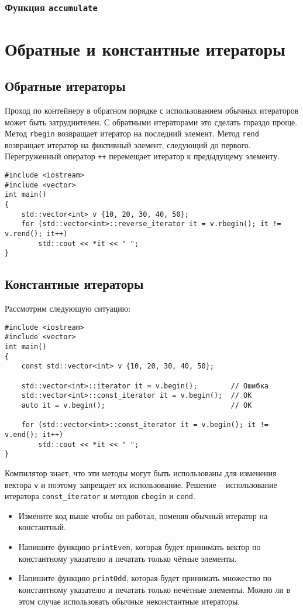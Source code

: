 \documentclass{article}
\begin{document}
\subsubsection*{Функция \texttt{accumulate}}



\newpage
\section*{Обратные и константные итераторы}
\subsection*{Обратные итераторы}
Проход по контейнеру в обратном порядке с использованием обычных итераторов может быть затруднителен. С обратными итераторами это сделать гораздо проще. Метод \texttt{rbegin} возвращает итератор на последний элемент. Метод \texttt{rend} возвращает итератор на фиктивный элемент, следующий до первого. Перегруженный оператор \texttt{++} перемещает итератор к предыдущему элементу.
\begin{lstlisting}
#include <iostream>
#include <vector>
int main()
{
    std::vector<int> v {10, 20, 30, 40, 50};
    for (std::vector<int>::reverse_iterator it = v.rbegin(); it != v.rend(); it++)
        std::cout << *it << " ";
}
\end{lstlisting}
\subsection*{Константные итераторы}
Рассмотрим следующую ситуацию:
\begin{lstlisting}
#include <iostream>
#include <vector>
int main() 
{
    const std::vector<int> v {10, 20, 30, 40, 50};
    
    std::vector<int>::iterator it = v.begin();        // Ошибка
    std::vector<int>::const_iterator it = v.begin();  // ОК
    auto it = v.begin();                              // ОК
    
    for (std::vector<int>::const_iterator it = v.begin(); it != v.end(); it++)
        std::cout << *it << " ";
}
\end{lstlisting}
Компилятор знает, что эти методы могут быть использованы для изменения вектора \texttt{v} и поэтому запрещает их использование. Решение -- использование итератора \texttt{const\_iterator} и методов \texttt{cbegin} и \texttt{cend}.

\begin{itemize}
\item Измените код выше чтобы он работал, поменяв обычный итератор на константный.
\item Напишите функцию \texttt{printEven}, которая будет принимать вектор по константному указателю и печатать только чётные элементы.
\item Напишите функцию \texttt{printOdd}, которая будет принимать множество по константному указателю и печатать только нечётные элементы. Можно ли в этом случае использовать обычные неконстантные итераторы.
\end{itemize}
\end{document}
